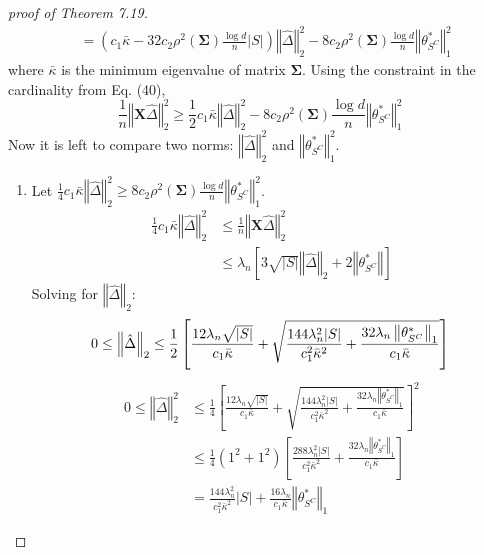 \documentclass[a4paper, 11pt]{article}
\begin{document}
\begin{proof}[proof of Theorem 7.19]
\begin{equation}
\begin{split}
 & = \left(c_1\bar{\kappa} - 32c_2\rho^2(\mathbf{\Sigma})\frac{\log d}{n}|S|\right)\left\Vert\hat{\Delta} \right\Vert_2^2 - 8c_2\rho^2(\mathbf{\Sigma})\frac{\log d}{n}\left\Vert \theta^*_{S^C} \right\Vert_1^2
\end{split}
\end{equation}
where $\bar{\kappa}$ is the minimum eigenvalue of matrix $\mathbf{\Sigma}$. Using the constraint in the cardinality from Eq. (40), 
\begin{equation}
\frac{1}{n}\left\Vert\mathbf{X}\hat{\Delta} \right\Vert_2^2 \geq \frac{1}{2}c_1\bar{\kappa}\left\Vert\hat{\Delta} \right\Vert_2^2 - 8c_2\rho^2(\mathbf{\Sigma})\frac{\log d}{n}\left\Vert \theta^*_{S^C} \right\Vert_1^2
\end{equation}
Now it is left to compare two norms: $\left\Vert\hat{\Delta} \right\Vert_2^2$ and $\left\Vert \theta^*_{S^C} \right\Vert_1^2$. 
\begin{enumerate}
\item Let $\frac{1}{4}c_1\bar{\kappa}\left\Vert\hat{\Delta} \right\Vert_2^2 \geq 8c_2\rho^2(\mathbf{\Sigma})\frac{\log d}{n}\left\Vert \theta^*_{S^C} \right\Vert_1^2$.
\begin{equation}
\begin{split}
\frac{1}{4}c_1\bar{\kappa}\left\Vert\hat{\Delta} \right\Vert_2^2 & \leq \frac{1}{n}\left\Vert\mathbf{X}\hat{\Delta} \right\Vert_2^2 \\
 & \leq \lambda_n\left[ 3\sqrt{|S|}\left\Vert\hat{\Delta} \right\Vert_2 + 2\left\Vert\theta^*_{S^C} \right\Vert \right]
\end{split}
\end{equation}
Solving for $\left\Vert\hat{\Delta} \right\Vert_2$:
\begin{equation}
0 \leq \left\Vert\hat{\Delta} \right\Vert_2 \leq \frac{1}{2}\left[\frac{12\lambda_n\sqrt{|S|}}{c_1\bar{\kappa}} + \sqrt{\frac{144\lambda_n^2|S|}{c_1^2\bar{\kappa}^2} + \frac{32\lambda_n\left\Vert\theta^*_{S^C} \right\Vert_1}{c_1\bar{\kappa}}} \right] \\ 
\end{equation}
\begin{equation}
\begin{split}
0 \leq \left\Vert\hat{\Delta} \right\Vert_2^2 & \leq \frac{1}{4}\left[\frac{12\lambda_n\sqrt{|S|}}{c_1\bar{\kappa}} + \sqrt{\frac{144\lambda_n^2|S|}{c_1^2\bar{\kappa}^2} + \frac{32\lambda_n\left\Vert\theta^*_{S^C} \right\Vert_1}{c_1\bar{\kappa}}} \right]^2 \\
 & \leq \frac{1}{4}(1^2+1^2)\left[\frac{288\lambda_n^2|S|}{c_1^2\bar{\kappa}^2} + \frac{32\lambda_n\left\Vert\theta^*_{S^C} \right\Vert_1}{c_1\bar{\kappa}} \right] \\ 
 & = \frac{144\lambda_n^2}{c_1^2\bar{\kappa}^2}|S| + \frac{16\lambda_n}{c_1\bar{\kappa}}\left\Vert\theta^*_{S^C} \right\Vert_1
\end{split}
\end{equation}



\end{enumerate}
\end{proof}
\end{document}
